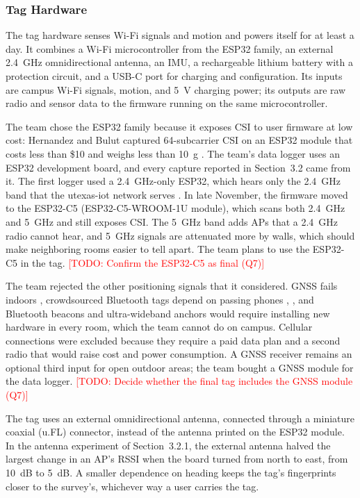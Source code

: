 \documentclass[12pt,letterpaper]{article}
\newcommand{\TODO}[1]{\textcolor{red}{[TODO: #1]}}
\begin{document}
\subsubsection{Tag Hardware}
The tag hardware senses Wi-Fi signals and motion and powers itself for at least a day. It combines a
Wi-Fi microcontroller from the ESP32 family, an external 2.4~GHz omnidirectional antenna, an IMU, a
rechargeable lithium battery with a protection circuit, and a USB-C port for charging and
configuration. Its inputs are campus Wi-Fi signals, motion, and 5~V charging power; its outputs are
raw radio and sensor data to the firmware running on the same microcontroller.

The team chose the ESP32 family because it exposes CSI to user firmware \cite{espcsi} at low cost:
Hernandez and Bulut captured 64-subcarrier CSI on an ESP32 module that costs less than \$10 and
weighs less than 10~g \cite{esp32tool}. The team's data logger uses an ESP32 development board, and
every capture reported in Section~3.2 came from it. The first logger used a 2.4~GHz-only ESP32, which
hears only the 2.4~GHz band that the utexas-iot network serves \cite{utiot}. In late November, the
firmware moved to the ESP32-C5 (ESP32-C5-WROOM-1U module), which scans both 2.4~GHz and 5~GHz and
still exposes CSI. The 5~GHz band adds APs that a 2.4~GHz radio cannot hear, and 5~GHz signals are
attenuated more by walls, which should make neighboring rooms easier to tell apart. The team plans to
use the ESP32-C5 in the tag. \TODO{Confirm the ESP32-C5 as final (Q7)}

The team rejected the other positioning signals that it considered. GNSS fails indoors \cite{hechan}, crowdsourced
Bluetooth tags depend on passing phones \cite{airtag}, \cite{smarttag}, and Bluetooth beacons and
ultra-wideband anchors would require installing new hardware in every room, which the team cannot do
on campus. Cellular connections were excluded because they require a paid data plan and a second
radio that would raise cost and power consumption. A GNSS receiver remains an optional third input
for open outdoor areas; the team bought a GNSS module for the data logger. \TODO{Decide whether the
final tag includes the GNSS module (Q7)}

The tag uses an external omnidirectional antenna, connected through a miniature coaxial (u.FL)
connector, instead of the antenna printed on the ESP32 module. In the antenna experiment of
Section~3.2.1, the external antenna halved the largest change in an AP's RSSI when the board turned
from north to east, from 10~dB to 5~dB. A smaller dependence on heading keeps the tag's fingerprints
closer to the survey's, whichever way a user carries the tag.
\end{document}
